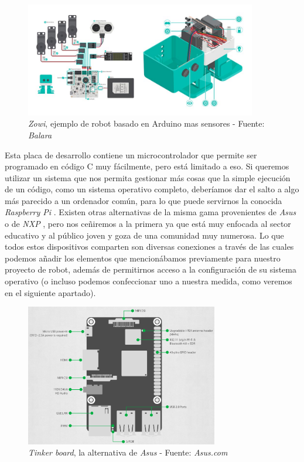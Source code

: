 \begin{figure}[h]
	\centering
	\includegraphics[width=0.9\textwidth]{imagenes/zowi-robot-componentes.jpg}
	\caption{\textit{Zowi}, ejemplo de robot basado en Arduino mas sensores - Fuente: \textit{Balara} \cite{zowi-balara}}
	\label{zowi-components}
\end{figure}

Esta placa de desarrollo contiene un microcontrolador que permite ser programado en código C muy fácilmente, pero está limitado a eso. Si queremos utilizar un sistema que nos permita gestionar más cosas que la simple ejecución de un código, como un sistema operativo completo, deberíamos dar el salto a algo más parecido a un ordenador común, para lo que puede servirnos la conocida \textit{Raspberry Pi} \cite{raspberry-pi}. Existen otras alternativas de la misma gama provenientes de \textit{Asus} o de \textit{NXP} \cite{nxp-imx}, pero nos ceñiremos a la primera ya que está muy enfocada al sector educativo y al público joven y goza de una comunidad muy numerosa. Lo que todos estos dispositivos comparten son diversas conexiones a través de las cuales podemos añadir los elementos que mencionábamos previamente para nuestro proyecto de robot, además de permitirnos acceso a la configuración de su sistema operativo (o incluso podemos confeccionar uno a nuestra medida, como veremos en el siguiente apartado).\\

\begin{figure}[h]
	\centering
	\includegraphics[width=0.75\textwidth]{imagenes/asus-tinker-conexiones.png}
	\caption{\textit{Tinker board}, la alternativa de \textit{Asus} - Fuente: \textit{Asus.com} \cite{asus-tinker}}
	\label{asus-tinker}
\end{figure}


